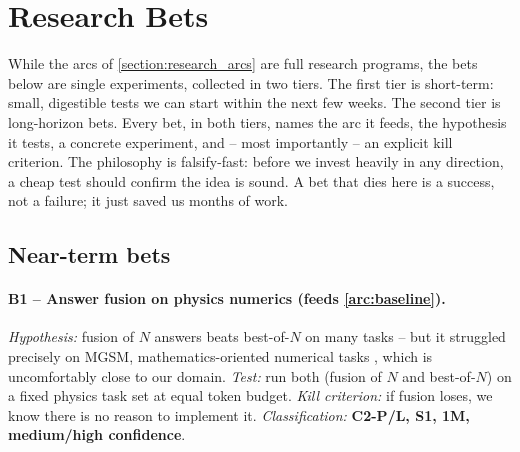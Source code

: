 \section{Research Bets}
\label{section:research_bets}

\begin{summarybox}
    While the arcs of \ref{section:research_arcs} are full research programs, the bets below are single experiments, collected in two tiers. The first tier is short-term: small, digestible tests we can start within the next few weeks. The second tier is long-horizon bets. Every bet, in both tiers, names the arc it feeds, the hypothesis it tests, a concrete experiment, and -- most importantly -- an explicit kill criterion. The philosophy is falsify-fast: before we invest heavily in any direction, a cheap test should confirm the idea is sound. A bet that dies here is a success, not a failure; it just saved us months of work.
\end{summarybox}



\subsection{Near-term bets}
\label{section:near_term_bets}

\paragraph{B1 -- Answer fusion on physics numerics (feeds \ref{arc:baseline}).}
\textit{Hypothesis:} fusion of $N$ answers beats best-of-$N$ on many tasks -- but it struggled precisely on MGSM, mathematics-oriented numerical tasks \cite{2510.00931}, which is uncomfortably close to our domain. 
\textit{Test:} run both (fusion of $N$ and best-of-$N$) on a fixed physics task set at equal token budget. 
\textit{Kill criterion:} if fusion loses, we know there is no reason to implement it.
\textit{Classification:} \textbf{C2-P/L, S1, 1M, medium/high confidence}.

